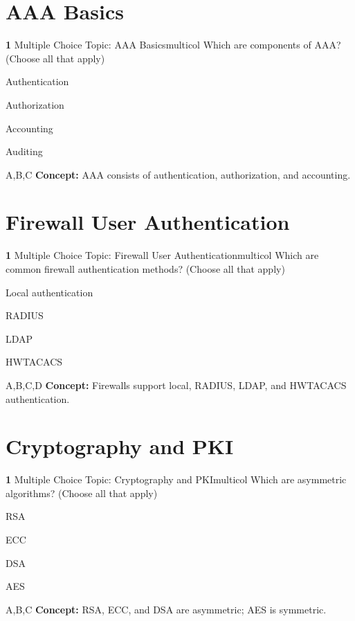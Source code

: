 \documentclass[10pt,a4paper]{article}
\begin{document}
\section{AAA Basics}
\begin{qcard}{\color{white}\textbf{1} \hfill \small Multiple Choice \textbar{} Topic: AAA Basics}{multicol}
Which are components of AAA? (Choose all that apply)

\begin{qoptions}
\item Authentication
\item Authorization
\item Accounting
\item Auditing
\end{qoptions}
\begin{explainbox}{A,B,C}
\textbf{Concept:} AAA consists of authentication, authorization, and accounting.
\end{explainbox}
\end{qcard}

\section{Firewall User Authentication}
\begin{qcard}{\color{white}\textbf{1} \hfill \small Multiple Choice \textbar{} Topic: Firewall User Authentication}{multicol}
Which are common firewall authentication methods? (Choose all that apply)

\begin{qoptions}
\item Local authentication
\item RADIUS
\item LDAP
\item HWTACACS
\end{qoptions}
\begin{explainbox}{A,B,C,D}
\textbf{Concept:} Firewalls support local, RADIUS, LDAP, and HWTACACS authentication.
\end{explainbox}
\end{qcard}

\section{Cryptography and PKI}
\begin{qcard}{\color{white}\textbf{1} \hfill \small Multiple Choice \textbar{} Topic: Cryptography and PKI}{multicol}
Which are asymmetric algorithms? (Choose all that apply)

\begin{qoptions}
\item RSA
\item ECC
\item DSA
\item AES
\end{qoptions}
\begin{explainbox}{A,B,C}
\textbf{Concept:} RSA, ECC, and DSA are asymmetric; AES is symmetric.
\end{explainbox}
\end{qcard}
\end{document}
